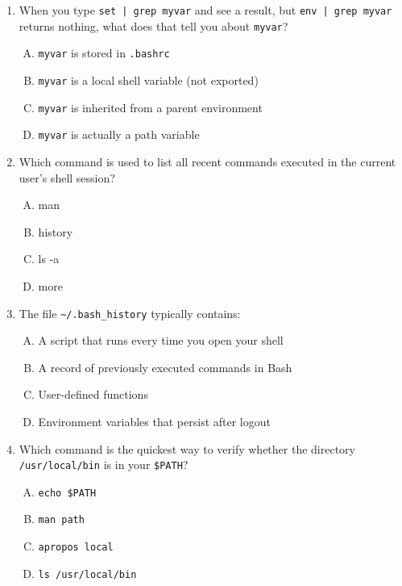 \documentclass[a4paper]{report}
\begin{document}
\begin{enumerate}[1.]
    \item When you type \texttt{set | grep myvar} and see a result, but \texttt{env | grep myvar} returns nothing, what does that tell you about \texttt{myvar}?  
    \begin{enumerate}[A)]
        \item \texttt{myvar} is stored in \texttt{.bashrc}  
        \item \texttt{myvar} is a local shell variable (not exported)  
        \item \texttt{myvar} is inherited from a parent environment  
        \item \texttt{myvar} is actually a path variable  
    \end{enumerate}

    \item Which command is used to list all recent commands executed in the current user’s shell session?  
    \begin{enumerate}[A)]
        \item man  
        \item history  
        \item ls -a  
        \item more  
    \end{enumerate}

    \item The file \texttt{\textasciitilde/.bash\_history} typically contains:  
    \begin{enumerate}[A)]
        \item A script that runs every time you open your shell  
        \item A record of previously executed commands in Bash  
        \item User-defined functions  
        \item Environment variables that persist after logout  
    \end{enumerate}

    \item Which command is the quickest way to verify whether the directory \texttt{/usr/local/bin} is in your \texttt{\$PATH}?  
    \begin{enumerate}[A)]
        \item \texttt{echo \$PATH}  
        \item \texttt{man path}  
        \item \texttt{apropos local}  
        \item \texttt{ls /usr/local/bin}  
    \end{enumerate}


\end{enumerate}
\end{document}
